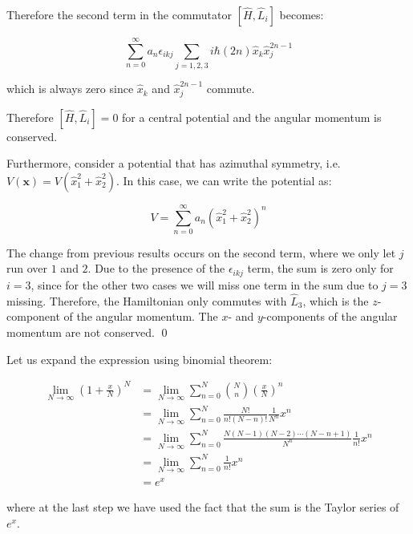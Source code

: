 \documentclass[12pt]{article}
\begin{document}
Therefore the second term in the commutator $[\hat{H}, \hat{L}_{i}]$ becomes:

\begin{equation}
    \sum_{n = 0}^{\infty} a_{n} \epsilon_{ikj} \sum_{j = 1, 2, 3} i \hbar (2n) \hat{x}_{k} \hat{x}_{j}^{2n-1}
\end{equation}

which is always zero since $\hat{x}_{k}$ and $\hat{x}_{j}^{2n-1}$ commute.

Therefore $[\hat{H}, \hat{L}_{i}] = 0$ for a central potential and the angular momentum is conserved.

Furthermore, consider a potential that has azimuthal symmetry, i.e. $V(\mathbf{x}) = V(\hat{x}_{1}^{2} + \hat{x}_{2}^{2})$. In this case, we can write the potential as:

\begin{equation}
    V = \sum_{n=0}^{\infty} a_{n} (\hat{x}_{1}^{2} + \hat{x}_{2}^{2})^{n}
\end{equation}

The change from previous results occurs on the second term, where we only let $j$ run over $1$ and $2$. Due to the presence of the $\epsilon_{ikj}$ term, the sum is zero only for $i = 3$, since for the other two cases we will miss one term in the sum due to $j = 3$ missing. Therefore, the Hamiltonian only commutes with $\hat{L}_{3}$, which is the $z$-component of the angular momentum. The $x$- and $y$-components of the angular momentum are not conserved.
\qed


Let us expand the expression using binomial theorem:

\begin{equation}
\begin{split}
    \lim_{N \to \infty} \left( 1 + \frac{x}{N} \right)^{N} &= \lim_{N \to \infty} \sum_{n = 0}^{N} \binom{N}{n} \left( \frac{x}{N} \right)^{n} \\
    &= \lim_{N \to \infty} \sum_{n = 0}^{N} \frac{N!}{n!(N-n)!} \frac{1}{N^{n}} x^{n} \\
    &= \lim_{N \to \infty} \sum_{n = 0}^{N} \frac{N(N-1)(N-2) \cdots (N-n+1)}{N^{n}} \frac{1}{n!} x^{n} \\
    &= \lim_{N \to \infty} \sum_{n = 0}^{N} \frac{1}{n!} x^{n} \\
    &= e^{x}
\end{split}
\end{equation}

where at the last step we have used the fact that the sum is the Taylor series of $e^{x}$.
\end{document}
